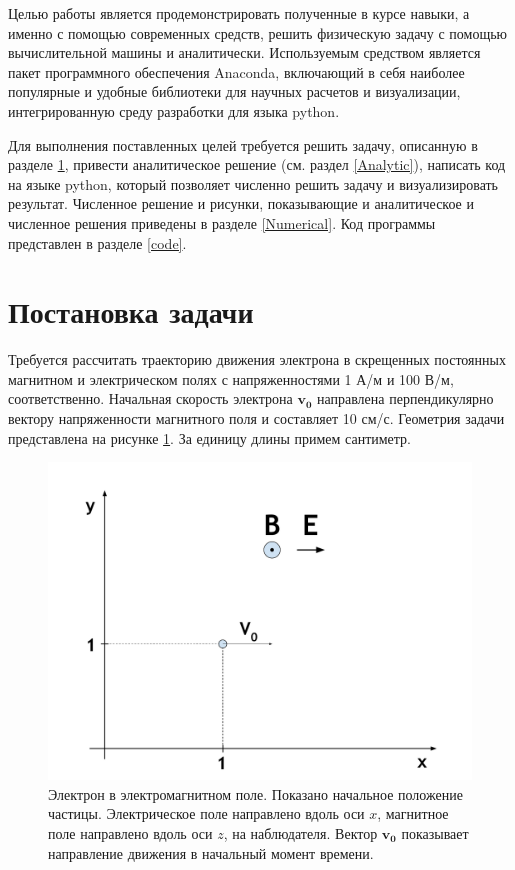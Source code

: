 \documentclass[a4paper]{article}
\begin{document}
Целью работы является продемонстрировать полученные в курсе навыки, а именно с помощью современных средств, решить физическую задачу с помощью вычислительной машины и аналитически. Используемым средством является пакет программного обеспечения Anaconda, включающий в себя наиболее популярные и удобные библиотеки для научных расчетов и визуализации, интегрированную среду разработки для языка python.

Для выполнения поставленных целей требуется решить задачу, описанную в разделе \ref{Problem}, привести аналитическое решение (см. раздел \eqref{Analytic}), написать код на языке python, который позволяет численно решить задачу и визуализировать результат. Численное решение и рисунки, показывающие и аналитическое и численное решения приведены в разделе \eqref{Numerical}. Код программы представлен в разделе \eqref{code}.
\section{Постановка задачи}\label{Problem}
Требуется рассчитать траекторию движения электрона в скрещенных
постоянных магнитном и электрическом полях с напряженностями 1 А/м и 100 В/м, соответственно. 
Начальная скорость электрона $\mathbf{v_0}$   направлена перпендикулярно вектору напряженности магнитного поля и составляет 10 см/с.
Геометрия задачи представлена на рисунке \ref{problem}. За единицу длины примем сантиметр.

\begin{figure}[h]
	\includegraphics[width=\textwidth]{problem.pdf}
	\caption{Электрон в электромагнитном поле. Показано начальное положение частицы. Электрическое поле направлено вдоль оси $x$, магнитное поле направлено вдоль оси $z$, на наблюдателя. Вектор $\mathbf{v_0}$ показывает направление движения в начальный момент времени.}
	\label{problem}
\end{figure}
\end{document}
